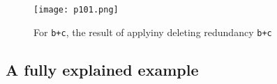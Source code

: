 \begin{figure}[H]
    \centering
     \texttt{[image: p101.png]}
         \caption{For \texttt{b+c}, the result of applyiny deleting redundancy \texttt{b+c}}
         \label{fig:p100}
\end{figure}



\subsection{A fully explained example}







    
   





